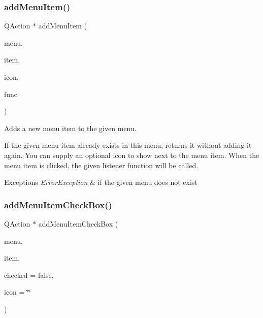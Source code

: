 \subsubsection{\texorpdfstring{add\+Menu\+Item()}{addMenuItem()}\hspace{0.1cm}{\footnotesize\ttfamily [4/4]}}
{\footnotesize\ttfamily Q\+Action $\ast$ add\+Menu\+Item (\begin{DoxyParamCaption}\item[{const std\+::string \&}]{menu,  }\item[{const std\+::string \&}]{item,  }\item[{const Q\+Pixmap \&}]{icon,  }\item[{G\+Event\+Listener\+Void}]{func }\end{DoxyParamCaption})\hspace{0.3cm}{\ttfamily [virtual]}}



Adds a new menu item to the given menu. 

If the given menu item already exists in this menu, returns it without adding it again. You can supply an optional icon to show next to the menu item. When the menu item is clicked, the given listener function will be called. 
\begin{DoxyExceptions}{Exceptions}
{\em Error\+Exception} & if the given menu does not exist \\
\hline
\end{DoxyExceptions}
\mbox{\label{classGWindow_ae363de5d4c0d5848a5936563b12c3288}} 
\subsubsection{\texorpdfstring{add\+Menu\+Item\+Check\+Box()}{addMenuItemCheckBox()}\hspace{0.1cm}{\footnotesize\ttfamily [1/2]}}
{\footnotesize\ttfamily Q\+Action $\ast$ add\+Menu\+Item\+Check\+Box (\begin{DoxyParamCaption}\item[{const std\+::string \&}]{menu,  }\item[{const std\+::string \&}]{item,  }\item[{bool}]{checked = {\ttfamily false},  }\item[{const std\+::string \&}]{icon = {\ttfamily \char`\"{}\char`\"{}} }\end{DoxyParamCaption})\hspace{0.3cm}{\ttfamily [virtual]}}




